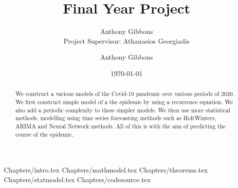 \documentclass[a4paper]{article}
\title{Final Year Project}
\author{Anthony Gibbons \qquad 17322353 \\ Project Supervisor: Athanasios Georgiadis}
\author{Anthony Gibbons}
\date{\today}
\begin{document}
\maketitle      

\begin{abstract}
    We construct a various models of the Covid-19 pandemic over various periods of 2020. We first construct simple model of a the epidemic by using a recurrence equation. We also add a periodic complexity to these simpler models. We then use more statistical methods, modelling using time series forecasting methods such as HoltWinters, ARIMA and Neural Network methods. All of this is with the aim of predicting the course of the epidemic.
\end{abstract}
\hypersetup{
    linkcolor=blue,
}
{Chapters/intro.tex}
{Chapters/mathmodel.tex}
{Chapters/theorems.tex}
{Chapters/statmodel.tex}
{Chapters/codesource.tex}

\printbibliography
\end{document}
